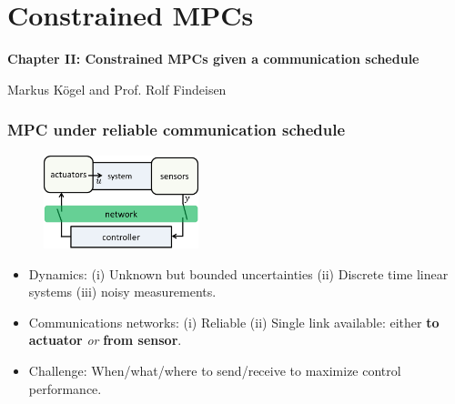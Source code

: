 \documentclass{beamer}
\begin{document}
\section{Constrained MPCs}
\begin{frame}
\centerline{\textbf{Chapter II: Constrained MPCs given a communication schedule}
}
\begin{center}
 Markus K\"{o}gel and Prof. Rolf Findeisen
\end{center}
\end{frame}
\begin{frame}
 \frametitle{MPC under reliable communication schedule}
 \begin{figure}
\centering
\includegraphics[width=0.4\textwidth, height = .25\textheight]{clc.png}
\end{figure}
 \begin{itemize}
  \item Dynamics: (i) Unknown but bounded uncertainties (ii) Discrete time linear systems (iii) noisy measurements.
  \item Communications networks: (i) Reliable (ii) Single link available: either \textbf{to actuator} \textit{or}
  \textbf{from sensor}.
  \item Challenge: When/what/where to send/receive to maximize control performance.
 \end{itemize}
\end{frame}
\end{document}
